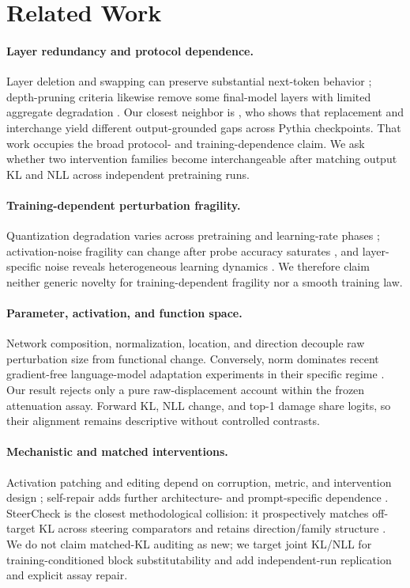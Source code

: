 \section{Related Work}

\paragraph{Layer redundancy and protocol dependence.}
Layer deletion and swapping can preserve substantial next-token behavior
\citep{lad2025remarkable}; depth-pruning criteria likewise remove some
final-model layers with limited aggregate degradation \citep{men2025shortgpt}.
Our closest neighbor is \citet{garcia2026nofreeswap}, who shows that replacement
and interchange yield different output-grounded gaps across Pythia checkpoints.
That work occupies the broad protocol- and training-dependence claim. We ask
whether two intervention families become interchangeable after matching output
KL and NLL across independent pretraining runs.

\paragraph{Training-dependent perturbation fragility.}
Quantization degradation varies across pretraining and learning-rate phases
\citep{catalantatjer2026training}; activation-noise fragility can change after
probe accuracy saturates \citep{reblitzrichardson2026fragility}, and
layer-specific noise reveals heterogeneous learning dynamics
\citep{borras2022walking}. We therefore claim neither generic novelty for
training-dependent fragility nor a smooth training law.

\paragraph{Parameter, activation, and function space.}
Network composition, normalization, location, and direction decouple raw
perturbation size from functional change. Conversely, norm dominates recent
gradient-free language-model adaptation experiments in their specific regime
\citep{kim2026norm}. Our result rejects only a pure raw-displacement account
within the frozen attenuation assay. Forward KL, NLL change, and top-1 damage
share logits, so their alignment remains descriptive without controlled
contrasts.

\paragraph{Mechanistic and matched interventions.}
Activation patching and editing depend on corruption, metric, and intervention
design \citep{zhang2023patching,makelov2024subspace}; self-repair adds further
architecture- and prompt-specific dependence \citep{rushing2024selfrepair}.
SteerCheck is the closest methodological collision: it prospectively matches
off-target KL across steering comparators and retains direction/family
structure \citep{luo2026steercheck}. We do not claim matched-KL auditing as new;
we target joint KL/NLL for training-conditioned block substitutability and add
independent-run replication and explicit assay repair.

